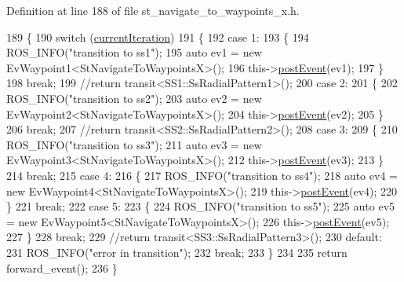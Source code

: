 Definition at line 188 of file st\+\_\+navigate\+\_\+to\+\_\+waypoints\+\_\+x.\+h.


\begin{DoxyCode}
189   \{
190     \textcolor{keywordflow}{switch} (\hyperlink{structsm__dance__bot_1_1StNavigateToWaypointsX_ac282dc1978f30ad53499dbfddd80ecdc}{currentIteration})
191     \{
192     \textcolor{keywordflow}{case} 1:
193     \{
194       ROS\_INFO(\textcolor{stringliteral}{"transition to ss1"});
195       \textcolor{keyword}{auto} ev1 = \textcolor{keyword}{new} EvWaypoint1<StNavigateToWaypointsX>();
196       this->\hyperlink{classsmacc_1_1ISmaccState_acef404ab3766ddf2892e8dad14a4a7cf}{postEvent}(ev1);
197     \}
198     \textcolor{keywordflow}{break};
199       \textcolor{comment}{//return transit<SS1::SsRadialPattern1>();}
200     \textcolor{keywordflow}{case} 2:
201     \{
202       ROS\_INFO(\textcolor{stringliteral}{"transition to ss2"});
203       \textcolor{keyword}{auto} ev2 = \textcolor{keyword}{new} EvWaypoint2<StNavigateToWaypointsX>();
204       this->\hyperlink{classsmacc_1_1ISmaccState_acef404ab3766ddf2892e8dad14a4a7cf}{postEvent}(ev2);
205     \}
206     \textcolor{keywordflow}{break};
207       \textcolor{comment}{//return transit<SS2::SsRadialPattern2>();}
208     \textcolor{keywordflow}{case} 3:
209     \{
210       ROS\_INFO(\textcolor{stringliteral}{"transition to ss3"});
211       \textcolor{keyword}{auto} ev3 = \textcolor{keyword}{new} EvWaypoint3<StNavigateToWaypointsX>();
212       this->\hyperlink{classsmacc_1_1ISmaccState_acef404ab3766ddf2892e8dad14a4a7cf}{postEvent}(ev3);
213     \}
214     \textcolor{keywordflow}{break};
215     \textcolor{keywordflow}{case} 4:
216     \{
217       ROS\_INFO(\textcolor{stringliteral}{"transition to ss4"});
218       \textcolor{keyword}{auto} ev4 = \textcolor{keyword}{new} EvWaypoint4<StNavigateToWaypointsX>();
219       this->\hyperlink{classsmacc_1_1ISmaccState_acef404ab3766ddf2892e8dad14a4a7cf}{postEvent}(ev4);
220     \}
221     \textcolor{keywordflow}{break};
222     \textcolor{keywordflow}{case} 5:
223     \{
224       ROS\_INFO(\textcolor{stringliteral}{"transition to ss5"});
225       \textcolor{keyword}{auto} ev5 = \textcolor{keyword}{new} EvWaypoint5<StNavigateToWaypointsX>();
226       this->\hyperlink{classsmacc_1_1ISmaccState_acef404ab3766ddf2892e8dad14a4a7cf}{postEvent}(ev5);
227     \}
228     \textcolor{keywordflow}{break};
229       \textcolor{comment}{//return transit<SS3::SsRadialPattern3>();}
230     \textcolor{keywordflow}{default}:
231       ROS\_INFO(\textcolor{stringliteral}{"error in transition"});
232       \textcolor{keywordflow}{break};
233     \}
234 
235     \textcolor{keywordflow}{return} forward\_event();
236   \}
\end{DoxyCode}
